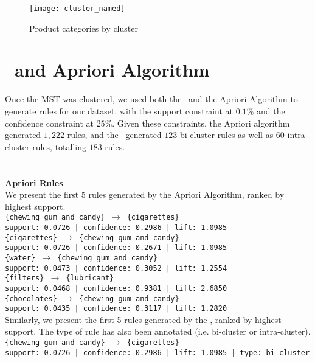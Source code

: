 \begin{figure}[H]
\centering
\texttt{[image: cluster\_named]}
\caption{Product categories by cluster}
\label{fig:cluster_named}
\end{figure}


\section{\algo\ and Apriori Algorithm}
Once the MST was clustered, we used both the \algo\ and the Apriori Algorithm to generate rules for our dataset, with the support constraint at $0.1\%$ and the confidence constraint at $25\%$. Given these constraints, the Apriori algorithm generated $1,222$ rules, and the \algo\ generated $123$ bi-cluster rules as well as $60$ intra-cluster rules, totalling $183$ rules.\\
\\\\\textbf{Apriori Rules}\\
We present the first 5 rules generated by the Apriori Algorithm, ranked by highest support.\\
\texttt{\{chewing gum and candy\} $\rightarrow$ \{cigarettes\}}\\\texttt{support: 0.0726 | confidence: 0.2986 | lift: 1.0985}\\
\texttt{\{cigarettes\} $\rightarrow$ \{chewing gum and candy\}}\\\texttt{support: 0.0726 | confidence: 0.2671 | lift: 1.0985}\\
\texttt{\{water\} $\rightarrow$ \{chewing gum and candy\}}\\\texttt{support: 0.0473 | confidence: 0.3052 | lift: 1.2554}\\
\texttt{\{filters\} $\rightarrow$ \{lubricant\}}\\\texttt{support: 0.0468 | confidence: 0.9381 | lift: 2.6850}\\
\texttt{\{chocolates\} $\rightarrow$ \{chewing gum and candy\}}\\\texttt{support: 0.0435 | confidence: 0.3117 | lift: 1.2820}\\
Similarly, we present the first 5 rules generated by the \algo, ranked by highest support. The type of rule has also been annotated (i.e. bi-cluster or intra-cluster).\\
\texttt{\{chewing gum and candy\} $\rightarrow$ \{cigarettes\}}\\\texttt{support: 0.0726 | confidence: 0.2986 | lift: 1.0985 | type: bi-cluster}\\
